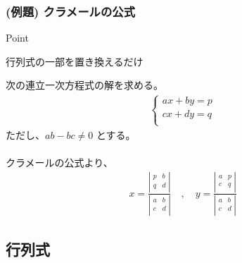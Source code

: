 \documentclass[a4paper]{jsarticle}
\begin{document}
\subsubsection{(例題) クラメールの公式}
\begin{itembox}[l]{Point}
    \begin{center}
        行列式の一部を置き換えるだけ
    \end{center}
\end{itembox}
次の連立一次方程式の解を求める。
\begin{eqnarray*}
    \begin{cases}
        ax+by=p \\
        cx+dy=q \\
    \end{cases}
\end{eqnarray*}
ただし、$ab-bc\neq 0$ とする。\\
\\
クラメールの公式より、
\begin{eqnarray*}
    x
    =\frac{
        \left| \begin{array}{rr}
            p & b \\
            q & d \\
        \end{array} \right|
    }
    {
        \left| \begin{array}{rr}
            a & b \\
            c & d \\
        \end{array} \right|
    }
    \quad ,\quad
    y
    =\frac{
        \left| \begin{array}{rr}
            a & p \\
            c & q \\
        \end{array} \right|
    }
    {
        \left| \begin{array}{rr}
            a & b \\
            c & d \\
        \end{array} \right|
    }
\end{eqnarray*}
\subsection{行列式}
\end{document}
